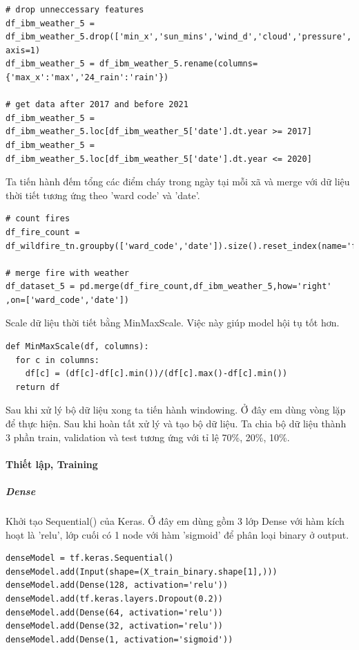 \documentclass{article}
\begin{document}
\begin{verbatim}
# drop unneccessary features
df_ibm_weather_5 = df_ibm_weather_5.drop(['min_x','sun_mins','wind_d','cloud','pressure','sunset','sunrise','7_rain','m_rain','province','max_y','min_y','rain'], axis=1)
df_ibm_weather_5 = df_ibm_weather_5.rename(columns={'max_x':'max','24_rain':'rain'})

# get data after 2017 and before 2021
df_ibm_weather_5 = df_ibm_weather_5.loc[df_ibm_weather_5['date'].dt.year >= 2017]
df_ibm_weather_5 = df_ibm_weather_5.loc[df_ibm_weather_5['date'].dt.year <= 2020]
\end{verbatim}

Ta tiến hành đếm tổng các điểm cháy trong ngày tại mỗi xã và merge với dữ liệu thời tiết tương ứng theo 'ward code' và 'date'.

\begin{verbatim}
# count fires
df_fire_count = df_wildfire_tn.groupby(['ward_code','date']).size().reset_index(name='fires')

# merge fire with weather
df_dataset_5 = pd.merge(df_fire_count,df_ibm_weather_5,how='right' ,on=['ward_code','date'])
\end{verbatim}

Scale dữ liệu thời tiết bằng MinMaxScale. Việc này giúp model hội tụ tốt hơn.

\begin{verbatim}
def MinMaxScale(df, columns):
  for c in columns:
    df[c] = (df[c]-df[c].min())/(df[c].max()-df[c].min())
  return df
\end{verbatim}

Sau khi xử lý bộ dữ liệu xong ta tiến hành windowing. Ở đây em dùng vòng lặp để thực hiện. Sau khi hoàn tất xử lý và tạo bộ dữ liệu. Ta chia bộ dữ liệu thành 3 phần train, validation và test tương ứng với tỉ lệ 70\%, 20\%, 10\%.

\paragraph{Thiết lập, Training}
\subparagraph{Dense} Khởi tạo Sequential() của Keras. Ở đây em dùng gồm 3 lớp Dense với hàm kích hoạt là 'relu', lớp cuối có 1 node với hàm 'sigmoid' để phân loại binary ở output.

\begin{verbatim}
denseModel = tf.keras.Sequential()
denseModel.add(Input(shape=(X_train_binary.shape[1],)))
denseModel.add(Dense(128, activation='relu'))
denseModel.add(tf.keras.layers.Dropout(0.2))
denseModel.add(Dense(64, activation='relu'))
denseModel.add(Dense(32, activation='relu'))
denseModel.add(Dense(1, activation='sigmoid'))
\end{verbatim}
\end{document}
